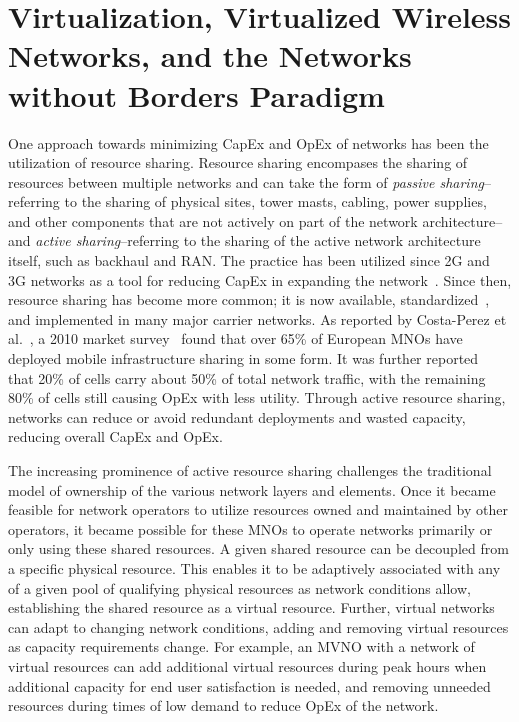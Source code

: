 \documentclass[12pt,dvipsnames]{report}
\begin{document}
\section{Virtualization, Virtualized Wireless Networks, and the Networks without Borders Paradigm} \label{sec:virtualization}

One approach towards minimizing CapEx and OpEx of networks has been the utilization of resource sharing.  Resource sharing encompases the sharing of resources between multiple networks and can take the form of \emph{passive sharing}--referring to the sharing of physical sites, tower masts, cabling, power supplies, and other components that are not actively on part of the network architecture--and \emph{active sharing}--referring to the sharing of the active network architecture itself, such as backhaul and RAN.  The practice has been utilized since 2G and 3G networks as a tool for reducing CapEx in expanding the network~\cite{1421931}.  Since then, resource sharing has become more common; it is now available, standardized~\cite{3GPP_TS_23.251}, and implemented in many major carrier networks.  As reported by Costa-Perez et al.~\cite{6553675}, a 2010 market survey~\cite{NetSharingReport} found that over 65\% of European MNOs have deployed mobile infrastructure sharing in some form.  It was further reported~\cite{6553675} that 20\% of cells carry about 50\% of total network traffic, with the remaining 80\% of cells still causing OpEx with less utility.  Through active resource sharing, networks can reduce or avoid redundant deployments and wasted capacity, reducing overall CapEx and OpEx.

The increasing prominence of active resource sharing challenges the traditional model of ownership of the various network layers and elements.  Once it became feasible for network operators to utilize resources owned and maintained by other operators, it became possible for these MNOs to operate networks primarily or only using these shared resources.  A given shared resource can be decoupled from a specific physical resource.  This enables it to be adaptively associated with any of a given pool of qualifying physical resources as network conditions allow, establishing the shared resource as a virtual resource.  Further, virtual networks can adapt to changing network conditions, adding and removing virtual resources as capacity requirements change.  For example, an MVNO with a network of virtual resources can add additional virtual resources during peak hours when additional capacity for end user satisfaction is needed, and removing unneeded resources during times of low demand to reduce OpEx of the network.
\end{document}
